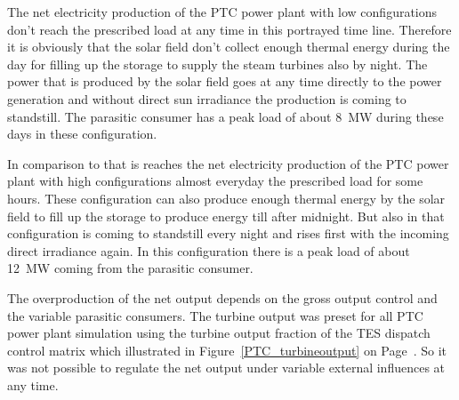 The net electricity production of the PTC power plant with low configurations don't reach the prescribed load at any time in this portrayed time line. Therefore it is obviously that the solar field don't collect enough thermal energy during the day for filling up the storage to supply the steam turbines also by night. The power that is produced by the solar field goes at any time directly to the power generation and without direct sun irradiance the production is coming to standstill. The parasitic consumer has a peak load of about 8~MW during these days in these configuration.

In comparison to that is reaches the net electricity production of the PTC power plant with high configurations almost everyday the prescribed load for some hours. These configuration can also produce enough thermal energy by the solar field to fill up the storage to produce energy till after midnight. But also in that configuration is coming to standstill every night and rises first with the incoming direct irradiance again. In this configuration there is a peak load of about 12~MW coming from the parasitic consumer. 

The overproduction of the net output depends on the gross output control and the variable parasitic consumers. The turbine output was preset for all PTC power plant simulation using the turbine output fraction of the TES dispatch control matrix which illustrated in Figure~\ref{PTC_turbineoutput} on Page~\pageref{PTC_turbineoutput}. So it was not possible to regulate the net output under variable external influences at any time. 

